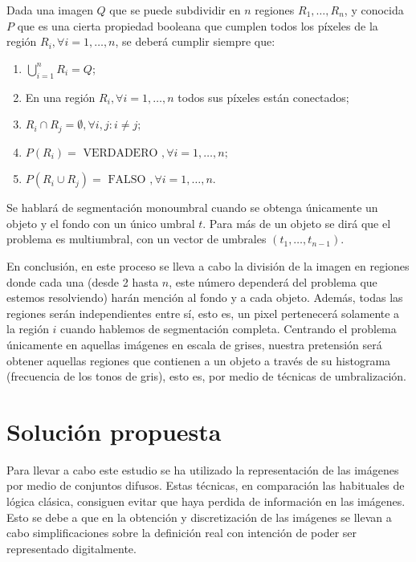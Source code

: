 \begin{definition}\label{def:definicionproblema}
Dada una imagen $Q$ que se puede subdividir en $n$ regiones $R_{1}, \dots, R_{n}$, y conocida $P$ que es una cierta propiedad booleana que cumplen todos los píxeles de la región $R_{i}, \forall  i=1,\dots ,n$, se deberá cumplir siempre que:
\begin{enumerate}
	\item $\bigcup_{i=1}^{n}R_{i}=Q$;
	\item En una región $R_{i}, \forall i=1,\dots ,n$ todos sus píxeles están conectados;
	\item $R_{i}\cap R_{j}=\emptyset, \forall i, j : i\neq j;$
	\item $P(R_{i}) = \text{ VERDADERO }, \forall  i=1,\dots ,n;$
	\item $P(R_{i}\cup R_{j}) = \text{ FALSO }, \forall  i=1,\dots ,n.$
\end{enumerate}
\end{definition}

Se hablará de segmentación monoumbral cuando se obtenga únicamente un objeto y el fondo con un único umbral $t$. Para más de un objeto se dirá que el problema es multiumbral, con un vector de umbrales $(t_1, \dots, t_{n-1})$.

En conclusión, en este proceso se lleva a cabo la división de la imagen en regiones donde cada una (desde 2 hasta $n$, este número dependerá del problema que estemos resolviendo) harán mención al fondo y a cada objeto. Además, todas las regiones serán independientes entre sí, esto es, un pixel pertenecerá solamente a la región $i$ cuando hablemos de segmentación completa. Centrando el problema únicamente en aquellas imágenes en escala de grises, nuestra pretensión será obtener aquellas regiones que contienen a un objeto a través de su histograma (frecuencia de los tonos de gris), esto es, por medio de técnicas de umbralización. %


\section{Solución propuesta}\label{sec:solucion}

Para llevar a cabo este estudio se ha utilizado la representación de las imágenes por medio de conjuntos difusos. Estas técnicas, en comparación las habituales de lógica clásica, consiguen evitar que haya perdida de información en las imágenes. Esto se debe a que en la obtención y discretización de las imágenes se llevan a cabo simplificaciones sobre la definición real con intención de poder ser representado digitalmente. 

